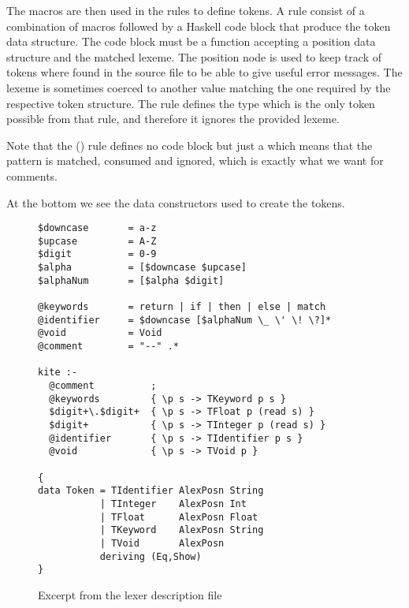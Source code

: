 The macros are then used in the rules to define tokens. A rule consist of a combination of macros followed by a Haskell code block that produce the token data structure. The code block must be a function accepting a position data structure and the matched lexeme. The position node is used to keep track of tokens where found in the source file to be able to give useful error messages. The lexeme is sometimes coerced to another value matching the one required by the respective token structure. The  rule defines the  type which is the only token possible from that rule, and therefore it ignores the provided lexeme.

Note that the () rule defines no code block but just a \code{;} which means that the pattern is matched, consumed and ignored, which is exactly what we want for comments.

At the bottom we see the data constructors used to create the tokens.

\begin{figure}[p]
\begin{lstlisting}
$downcase		= a-z
$upcase			= A-Z
$digit			= 0-9
$alpha			= [$downcase $upcase]
$alphaNum		= [$alpha $digit]

@keywords		= return | if | then | else | match
@identifier		= $downcase [$alphaNum \_ \' \! \?]*
@void           = Void
@comment		= "--" .*

kite :-
  @comment		    ;
  @keywords		    { \p s -> TKeyword p s }
  $digit+\.$digit+	{ \p s -> TFloat p (read s) }
  $digit+		    { \p s -> TInteger p (read s) }
  @identifier		{ \p s -> TIdentifier p s }
  @void		        { \p s -> TVoid p }

{
data Token = TIdentifier AlexPosn String
           | TInteger    AlexPosn Int
           | TFloat      AlexPosn Float
           | TKeyword    AlexPosn String
           | TVoid       AlexPosn
           deriving (Eq,Show)
}
\end{lstlisting}
\caption{Excerpt from the lexer description file}
\label{fig:lexer}
\end{figure}

